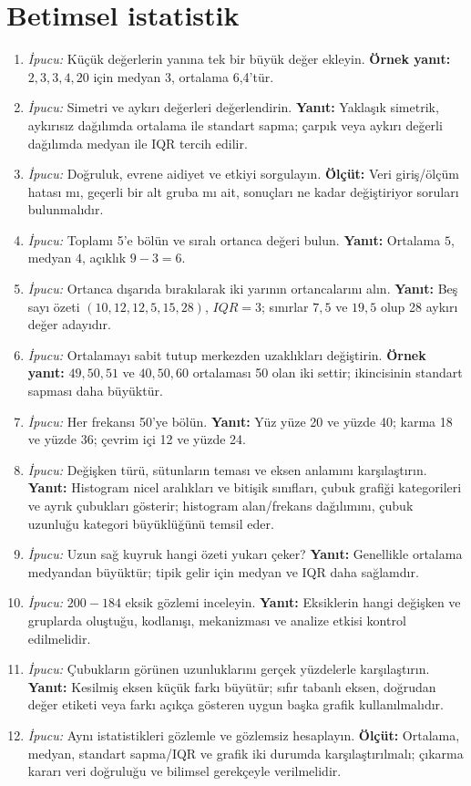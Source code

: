 \section{Betimsel istatistik}

\begin{enumerate}[leftmargin=*,itemsep=5pt]
\item \emph{İpucu:} Küçük değerlerin yanına tek bir büyük değer ekleyin.
\textbf{Örnek yanıt:} $2,3,3,4,20$ için medyan 3, ortalama 6,4'tür.
\item \emph{İpucu:} Simetri ve aykırı değerleri değerlendirin.
\textbf{Yanıt:} Yaklaşık simetrik, aykırısız dağılımda ortalama ile standart
sapma; çarpık veya aykırı değerli dağılımda medyan ile IQR tercih edilir.
\item \emph{İpucu:} Doğruluk, evrene aidiyet ve etkiyi sorgulayın.
\textbf{Ölçüt:} Veri giriş/ölçüm hatası mı, geçerli bir alt gruba mı ait,
sonuçları ne kadar değiştiriyor soruları bulunmalıdır.
\item \emph{İpucu:} Toplamı 5'e bölün ve sıralı ortanca değeri bulun.
\textbf{Yanıt:} Ortalama $5$, medyan $4$, açıklık $9-3=6$.
\item \emph{İpucu:} Ortanca dışarıda bırakılarak iki yarının ortancalarını alın.
\textbf{Yanıt:} Beş sayı özeti $(10,12,12{,}5,15,28)$, $IQR=3$; sınırlar
$7{,}5$ ve $19{,}5$ olup 28 aykırı değer adayıdır.
\item \emph{İpucu:} Ortalamayı sabit tutup merkezden uzaklıkları değiştirin.
\textbf{Örnek yanıt:} $49,50,51$ ve $40,50,60$ ortalaması 50 olan iki settir;
ikincisinin standart sapması daha büyüktür.
\item \emph{İpucu:} Her frekansı 50'ye bölün.
\textbf{Yanıt:} Yüz yüze 20 ve yüzde 40; karma 18 ve yüzde 36; çevrim içi 12
ve yüzde 24.
\item \emph{İpucu:} Değişken türü, sütunların teması ve eksen anlamını karşılaştırın.
\textbf{Yanıt:} Histogram nicel aralıkları ve bitişik sınıfları, çubuk grafiği
kategorileri ve ayrık çubukları gösterir; histogram alan/frekans dağılımını,
çubuk uzunluğu kategori büyüklüğünü temsil eder.
\item \emph{İpucu:} Uzun sağ kuyruk hangi özeti yukarı çeker?
\textbf{Yanıt:} Genellikle ortalama medyandan büyüktür; tipik gelir için
medyan ve IQR daha sağlamdır.
\item \emph{İpucu:} $200-184$ eksik gözlemi inceleyin.
\textbf{Yanıt:} Eksiklerin hangi değişken ve gruplarda oluştuğu, kodlanışı,
mekanizması ve analize etkisi kontrol edilmelidir.
\item \emph{İpucu:} Çubukların görünen uzunluklarını gerçek yüzdelerle karşılaştırın.
\textbf{Yanıt:} Kesilmiş eksen küçük farkı büyütür; sıfır tabanlı eksen,
doğrudan değer etiketi veya farkı açıkça gösteren uygun başka grafik kullanılmalıdır.
\item \emph{İpucu:} Aynı istatistikleri gözlemle ve gözlemsiz hesaplayın.
\textbf{Ölçüt:} Ortalama, medyan, standart sapma/IQR ve grafik iki durumda
karşılaştırılmalı; çıkarma kararı veri doğruluğu ve bilimsel gerekçeyle verilmelidir.
\end{enumerate}

